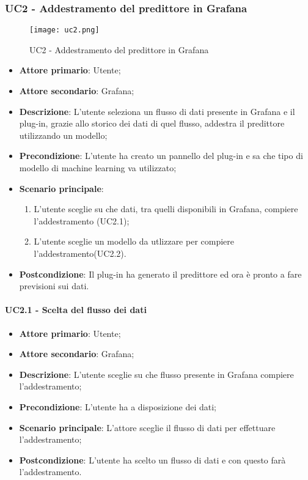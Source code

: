 \newpage
\subsubsection{UC2 - Addestramento del predittore in Grafana}
\label{sssec:uc2}

\begin{figure}[h!]
  \begin{center}
    \texttt{[image: uc2.png]}\\
    \caption{UC2 - Addestramento del predittore in Grafana}%
    \label{fig:uc2}
  \end{center}
\end{figure}

\begin{itemize}
  \item \textbf{Attore primario}:  Utente;
  \item \textbf{Attore secondario}: Grafana;
  \item \textbf{Descrizione}: L'utente seleziona un flusso di dati presente in Grafana e il plug-in, grazie allo storico dei dati di quel flusso, addestra il predittore utilizzando un modello;
  \item \textbf{Precondizione}: L'utente ha creato un pannello del plug-in e sa che tipo di modello di machine learning va utilizzato;
  \item \textbf{Scenario principale}:
  \begin{enumerate}
    \item L'utente sceglie su che dati, tra quelli disponibili in Grafana, compiere l'addestramento (UC2.1);
    \item L'utente sceglie un modello da utlizzare per compiere l'addestramento(UC2.2).
  \end{enumerate}
  \item \textbf{Postcondizione}: Il plug-in ha generato il predittore ed ora è pronto a fare previsioni sui dati.
\end{itemize}

\paragraph{UC2.1 - Scelta del flusso dei dati}
\label{para:uc2.1}
\begin{itemize}
  \item \textbf{Attore primario}: Utente;
  \item \textbf{Attore secondario}: Grafana;
  \item \textbf{Descrizione}: L'utente sceglie su che flusso presente in Grafana compiere l'addestramento;
  \item \textbf{Precondizione}: L'utente ha a disposizione dei dati;
  \item \textbf{Scenario principale}: L'attore sceglie il flusso di dati per effettuare l'addestramento;
  \item \textbf{Postcondizione}: L'utente ha scelto un flusso di dati e con questo farà l'addestramento.
\end{itemize}

